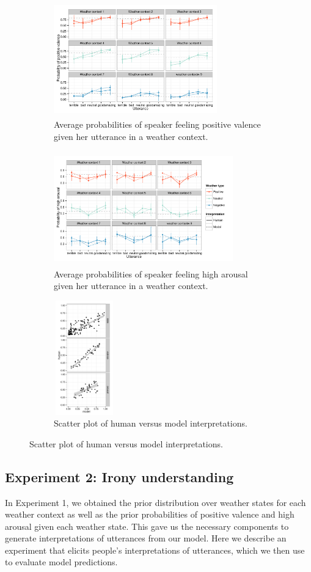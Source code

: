 \documentclass[10pt,letterpaper]{article}
\begin{document}
\begin{figure}[t]
\centering
\begin{subfigure}{0.4\textwidth}
\includegraphics[width=200pt, height=140pt]{model-valence.pdf}
\caption{Average probabilities of speaker feeling positive valence given her utterance in a weather context.}
\label{valence}
\end{subfigure}
\begin{subfigure}{0.43\textwidth}
\includegraphics[width=220pt, height=140pt]{model-arousal.pdf}
\caption{Average probabilities of speaker feeling high arousal given her utterance in a weather context.}
\label{arousal}
\end{subfigure}
\begin{subfigure}{0.15\textwidth}
\includegraphics[width=75pt, height=140pt]{scatters.pdf}
\caption{Scatter plot of human versus model interpretations.}
\label{scatter}
\end{subfigure}
\end{figure}


\subsection{Experiment 2: Irony understanding}
In Experiment 1, we obtained the prior distribution over weather states for each weather context as well as the prior probabilities of positive valence and high arousal given each weather state. This gave us the necessary components to generate interpretations of utterances from our model. Here we describe an experiment that elicits people's interpretations of utterances, which we then use to evaluate model predictions. 
\end{document}
